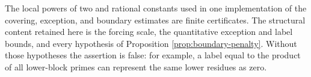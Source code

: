 The local powers of two and rational constants used in one implementation of
the covering, exception, and boundary estimates are finite certificates.  The
structural content retained here is the forcing scale, the quantitative
exception and label bounds, and every hypothesis of Proposition
\ref{prop:boundary-penalty}.  Without those hypotheses the assertion is false:
for example, a label equal to the product of all lower-block primes can represent
the same lower residues as zero.

